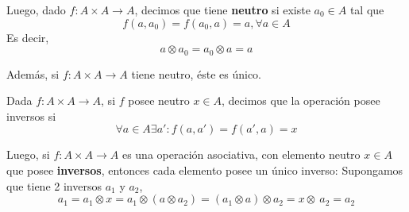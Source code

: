 \documentclass[11pt,a4paper]{article}
\begin{document}
\noindent \dotfill

\noindent Luego, dado $f : A \times A \rightarrow A$, decimos que tiene \textbf{neutro} si existe $a_0 \in A$ tal que $$f(a, a_0) = f(a_0, a) = a, \forall a \in A$$
\noindent Es decir, $$a \otimes a_0 = a_0 \otimes a = a$$

\noindent Adem\'as, si $f : A \times A \rightarrow A$ tiene neutro, \'este es \'unico.\\

\noindent \dotfill

\noindent Dada $f : A \times A \rightarrow A$, si $f$ posee neutro $x \in A$, decimos que la operaci\'on posee inversos si $$\forall a \in A \exists a' : f(a, a') = f(a', a) = x$$

\noindent Luego, si $f : A \times A \rightarrow A$ es una operaci\'on asociativa, con elemento neutro $x \in A$ que posee \textbf{inversos}, entonces cada elemento posee un \'unico inverso: Supongamos que tiene 2 inversos $a_1$ y $a_2$, $$a_1 = a_1 \otimes x = a_1 \otimes (a \otimes a_2) = (a_1 \otimes a) \otimes a_2 = x \otimes\ a_2 = a_2$$

\noindent \dotfill
\end{document}
